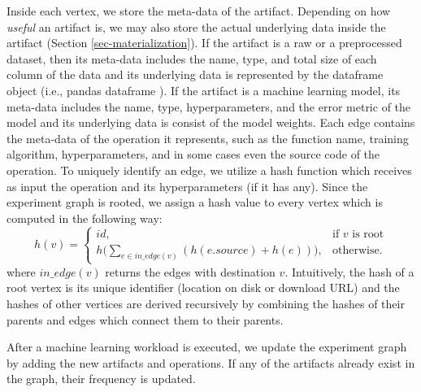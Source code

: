 Inside each vertex, we store the meta-data of the artifact.
Depending on how \textit{useful} an artifact is, we may also store the actual underlying data inside the artifact (Section \ref{sec-materialization}).
If the artifact is a raw or a preprocessed dataset, then its meta-data includes the name, type, and total size of each column of the data and its underlying data is represented by the dataframe object (i.e., pandas dataframe \cite{mckinney-proc-scipy-2010}). 
If the artifact is a machine learning model, its meta-data includes the name, type, hyperparameters, and the error metric of the model and its underlying data is consist of the model weights.
Each edge contains the meta-data of the operation it represents, such as the function name, training algorithm, hyperparameters, and in some cases even the source code of the operation.
To uniquely identify an edge, we utilize a hash function which receives as input the operation and its hyperparameters (if it has any).
Since the experiment graph is rooted, we assign a hash value to every vertex which is computed in the following way:
\[
    h(v)= 
\begin{cases}
    id,& \text{if } v \text{ is root}\\
    h\Big(\sum\limits_{e \in in\_edge(v)} (h(e.source) + h(e) ) \Big)  ,              & \text{otherwise}.
\end{cases}
\]
where $in\_edge(v)$ returns the edges with destination $v$. 
Intuitively, the hash of a root vertex is its unique identifier (location on disk or download URL) and the hashes of other vertices are derived recursively by combining the hashes of their parents and edges which connect them to their parents.
%
%

After a machine learning workload is executed, we update the experiment graph by adding the new artifacts and operations.
If any of the artifacts already exist in the graph, their frequency is updated.

